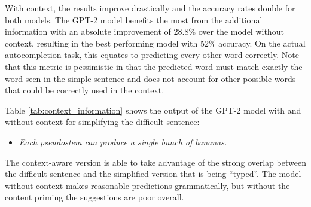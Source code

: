 \documentclass[11pt,a4paper]{article}
\begin{document}
With context, the results improve drastically and the accuracy rates double for both models.  The GPT-2 model benefits the most from the additional information with an absolute improvement of 28.8\% over the model without context, resulting in the best performing model with 52\% accuracy.  On the actual autocompletion task, this equates to predicting every other word correctly.  Note that this metric is pessimistic in that the predicted word must match exactly the word seen in the simple sentence and does not account for other possible words that could be correctly used in the context.

Table \ref{tab:context_information} shows the output of the GPT-2 model with and without context for simplifying the difficult sentence:

\vspace{-0.1in}
\begin{itemize}
    \item[] \textit{Each pseudostem can produce a single bunch of bananas.}
\end{itemize}

\vspace{-0.1in}

\noindent The context-aware version is able to take advantage of the strong overlap between the difficult sentence and the simplified version that is being ``typed''.  The model without context makes reasonable predictions grammatically, but without the content priming the suggestions are poor overall.
\end{document}
